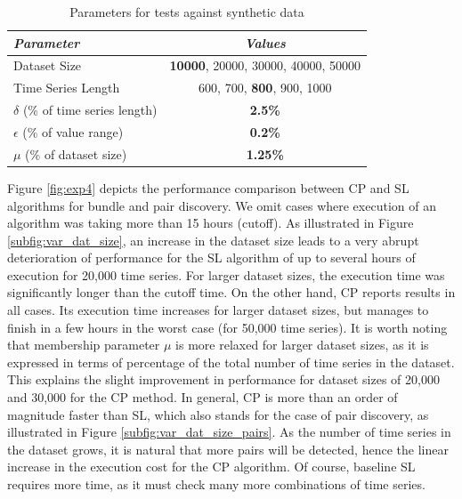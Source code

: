 \begin{table}[tb]
\centering
\caption{Parameters for tests against synthetic data}
 \vspace{-10pt}
\begin{small}
\begin{tabular}{lc} 
\hline
{\em Parameter} &{\em Values} \\
\hline
Dataset Size & \textbf{10000}, 20000, 30000, 40000, 50000 \\
Time Series Length & 600, 700, \textbf{800}, 900, 1000 \\
$\delta$ (\% of time series length) & \textbf{2.5\%} \\
$\epsilon$ (\% of value range) & \textbf{0.2\%} \\
$\mu$ (\% of dataset size) & \textbf{1.25\%} \\
\hline
\end{tabular}
\end{small}
\label{tab:parameters2}
\end{table}

Figure \ref{fig:exp4} depicts the performance comparison between CP and SL algorithms for bundle and pair discovery. We omit cases where execution of an algorithm was taking more than 15 hours (cutoff). As illustrated in Figure \ref{subfig:var_dat_size}, an increase in the dataset size leads to a very abrupt deterioration of performance for the SL algorithm of up to several hours of execution for 20,000 time series. For larger dataset sizes, the execution time was significantly longer than the cutoff time. On the other hand, CP reports results in all cases. Its execution time increases for larger dataset sizes, but manages to finish in a few hours in the worst case (for 50,000 time series). It is worth noting that membership parameter $\mu$ is more relaxed for larger dataset sizes, as it is expressed in terms of percentage of the total number of time series in the dataset. This explains the slight improvement in performance  for dataset sizes of 20,000 and 30,000 for the CP method. In general, CP is more than an order of magnitude faster than SL, which also stands for the case of pair discovery, as illustrated in Figure \ref{subfig:var_dat_size_pairs}. As the number of time series in the dataset grows, it is natural that more pairs will be detected, hence the linear increase in the execution cost for the CP algorithm. Of course, baseline SL requires more time, as it must check many more combinations of time series.

